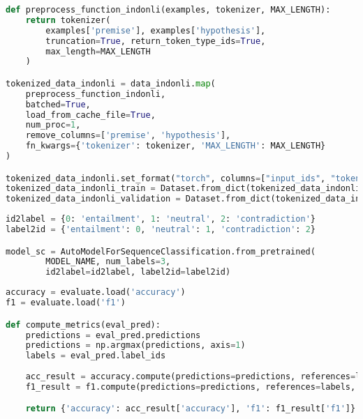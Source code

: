 \begin{lstlisting}[language=Python, caption=Proses \emph{preprocess} dan tokenisasi \emph{dataset} IndoNLI]
def preprocess_function_indonli(examples, tokenizer, MAX_LENGTH):
    return tokenizer(
        examples['premise'], examples['hypothesis'],
        truncation=True, return_token_type_ids=True,
        max_length=MAX_LENGTH
    )

tokenized_data_indonli = data_indonli.map(
    preprocess_function_indonli,
    batched=True,
    load_from_cache_file=True,
    num_proc=1,
    remove_columns=['premise', 'hypothesis'],
    fn_kwargs={'tokenizer': tokenizer, 'MAX_LENGTH': MAX_LENGTH}
)

tokenized_data_indonli.set_format("torch", columns=["input_ids", "token_type_ids"], output_all_columns=True, device=device)
tokenized_data_indonli_train = Dataset.from_dict(tokenized_data_indonli["train"][:SAMPLE])
tokenized_data_indonli_validation = Dataset.from_dict(tokenized_data_indonli["validation"][:SAMPLE])
\end{lstlisting}

\begin{lstlisting}[language=Python, caption=Mengimpor model \emph{sequence classification}]
id2label = {0: 'entailment', 1: 'neutral', 2: 'contradiction'}
label2id = {'entailment': 0, 'neutral': 1, 'contradiction': 2}

model_sc = AutoModelForSequenceClassification.from_pretrained(
        MODEL_NAME, num_labels=3, 
        id2label=id2label, label2id=label2id)
\end{lstlisting}

\begin{lstlisting}[language=Python, caption=Perancangan metrik komputasi untuk penilaian \emph{sequence classification task}]
accuracy = evaluate.load('accuracy')
f1 = evaluate.load('f1')

def compute_metrics(eval_pred):
    predictions = eval_pred.predictions
    predictions = np.argmax(predictions, axis=1)
    labels = eval_pred.label_ids
    
    acc_result = accuracy.compute(predictions=predictions, references=labels)
    f1_result = f1.compute(predictions=predictions, references=labels, average="weighted")

    return {'accuracy': acc_result['accuracy'], 'f1': f1_result['f1']}
\end{lstlisting}

